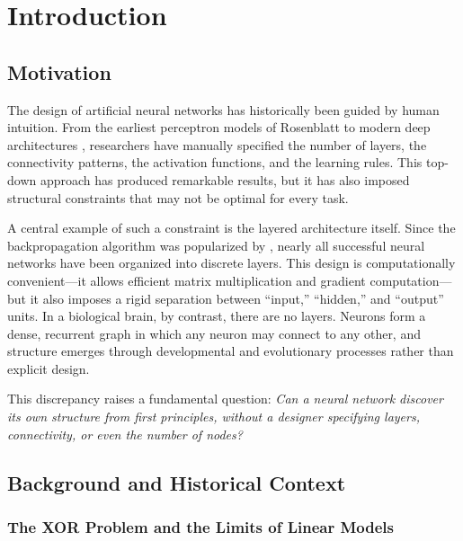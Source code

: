 
\chapter{Introduction}
\label{ch:introduction}

\section{Motivation}

The design of artificial neural networks has historically been guided by
human intuition. From the earliest perceptron models of Rosenblatt
\citep{rosenblatt1958perceptron} to modern deep architectures
\citep{lecun2015deep}, researchers have manually specified the number of
layers, the connectivity patterns, the activation functions, and the
learning rules. This top-down approach has produced remarkable results,
but it has also imposed structural constraints that may not be optimal
for every task.

A central example of such a constraint is the layered architecture
itself. Since the backpropagation algorithm was popularized by
\citet{rumelhart1986learning}, nearly all successful neural networks
have been organized into discrete layers. This design is computationally
convenient—it allows efficient matrix multiplication and gradient
computation—but it also imposes a rigid separation between ``input,''
``hidden,'' and ``output'' units. In a biological brain, by contrast,
there are no layers. Neurons form a dense, recurrent graph in which any
neuron may connect to any other, and structure emerges through
developmental and evolutionary processes rather than explicit design.

This discrepancy raises a fundamental question: \emph{Can a neural
network discover its own structure from first principles, without a
designer specifying layers, connectivity, or even the number of nodes?}

\section{Background and Historical Context}

\subsection{The XOR Problem and the Limits of Linear Models}

